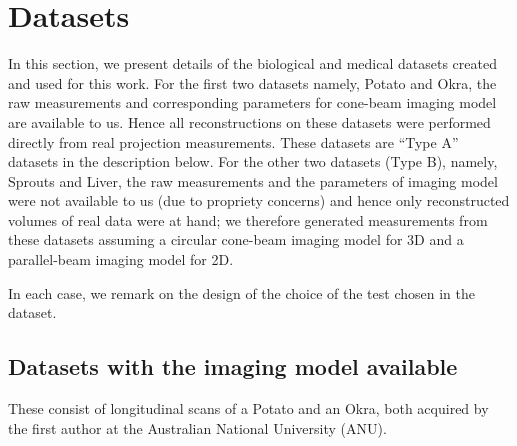 \documentclass[journal]{IEEEtran}
\begin{document}
\section{Datasets}
\label{sec:datasets}
In this section, we present details of the biological and medical
datasets created and used for this work. For the first two datasets
namely, Potato and Okra, the raw measurements and corresponding
parameters for cone-beam imaging model are available to us.  Hence all
reconstructions on these datasets were performed directly from real
projection measurements. These datasets are ``Type A'' datasets in the
description below.  For the other two datasets (Type B), namely,
Sprouts and Liver, the raw measurements and the parameters of imaging
model were not available to us (due to propriety concerns) and hence
only reconstructed volumes of real data were at hand; we therefore
generated measurements from these datasets assuming a circular
cone-beam imaging model for 3D and a parallel-beam imaging model for
2D.

In each case, we remark on the design of the choice of the test chosen
in the dataset.

\subsection{Datasets with the imaging model available}
\label{sec:potatoAndOkra}

These consist of longitudinal scans of a Potato and an Okra, both
acquired by the first author at the Australian National University
(ANU). 
\end{document}
